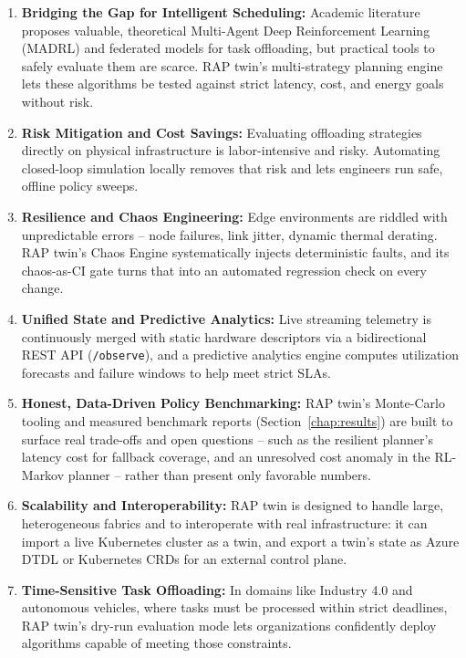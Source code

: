 \documentclass[12pt,a4]{report}
\begin{document}
\begin{enumerate}
    \item \textbf{Bridging the Gap for Intelligent Scheduling:} Academic literature proposes valuable, theoretical Multi-Agent Deep Reinforcement Learning (MADRL) and federated models for task offloading, but practical tools to safely evaluate them are scarce. RAP twin's multi-strategy planning engine lets these algorithms be tested against strict latency, cost, and energy goals without risk.
    \item \textbf{Risk Mitigation and Cost Savings:} Evaluating offloading strategies directly on physical infrastructure is labor-intensive and risky. Automating closed-loop simulation locally removes that risk and lets engineers run safe, offline policy sweeps.
    \item \textbf{Resilience and Chaos Engineering:} Edge environments are riddled with unpredictable errors -- node failures, link jitter, dynamic thermal derating. RAP twin's Chaos Engine systematically injects deterministic faults, and its chaos-as-CI gate turns that into an automated regression check on every change.
    \item \textbf{Unified State and Predictive Analytics:} Live streaming telemetry is continuously merged with static hardware descriptors via a bidirectional REST API (\texttt{/observe}), and a predictive analytics engine computes utilization forecasts and failure windows to help meet strict SLAs.
    \item \textbf{Honest, Data-Driven Policy Benchmarking:} RAP twin's Monte-Carlo tooling and measured benchmark reports (Section~\ref{chap:results}) are built to surface real trade-offs and open questions -- such as the resilient planner's latency cost for fallback coverage, and an unresolved cost anomaly in the RL-Markov planner -- rather than present only favorable numbers.
    \item \textbf{Scalability and Interoperability:} RAP twin is designed to handle large, heterogeneous fabrics and to interoperate with real infrastructure: it can import a live Kubernetes cluster as a twin, and export a twin's state as Azure DTDL or Kubernetes CRDs for an external control plane.
    \item \textbf{Time-Sensitive Task Offloading:} In domains like Industry 4.0 and autonomous vehicles, where tasks must be processed within strict deadlines, RAP twin's dry-run evaluation mode lets organizations confidently deploy algorithms capable of meeting those constraints.
\end{enumerate}
\end{document}
